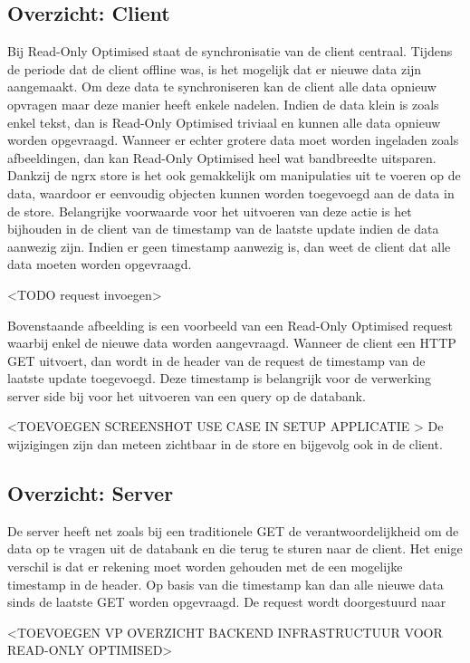 \subsection{Overzicht: Client}
Bij Read-Only Optimised staat de synchronisatie van de client centraal. Tijdens de periode dat de client offline was, is het mogelijk dat er nieuwe data zijn aangemaakt. Om deze data te synchroniseren kan de client alle data opnieuw opvragen maar deze manier heeft enkele nadelen. Indien de data klein is zoals enkel tekst, dan is Read-Only Optimised triviaal en kunnen alle data opnieuw worden opgevraagd. Wanneer er echter grotere data moet worden ingeladen zoals afbeeldingen, dan kan Read-Only Optimised heel wat bandbreedte uitsparen. Dankzij de ngrx store is het ook gemakkelijk om manipulaties uit te voeren op de data, waardoor er eenvoudig objecten kunnen worden toegevoegd aan de data in de store. Belangrijke voorwaarde voor het uitvoeren van deze actie is het bijhouden in de client van de timestamp van de laatste update indien de data aanwezig zijn. Indien er geen timestamp aanwezig is, dan weet de client dat alle data moeten worden opgevraagd.

<TODO request invoegen>

Bovenstaande afbeelding is een voorbeeld van een Read-Only Optimised request waarbij enkel de nieuwe data worden aangevraagd. Wanneer de client een HTTP GET uitvoert, dan wordt in de header van de request de timestamp van de laatste update toegevoegd. Deze timestamp is belangrijk voor de verwerking server side bij voor het uitvoeren van een query op de databank.

<TOEVOEGEN SCREENSHOT USE CASE IN SETUP APPLICATIE >
De wijzigingen zijn dan meteen zichtbaar in de store en bijgevolg ook in de client.
\subsection{Overzicht: Server}
De server heeft net zoals bij een traditionele GET de verantwoordelijkheid om de data op te vragen uit de databank en die terug te sturen naar de client. Het enige verschil is dat er rekening moet worden gehouden met de een mogelijke timestamp in de header. Op basis van die timestamp kan dan alle nieuwe data sinds de laatste GET worden opgevraagd. De request wordt doorgestuurd naar 

<TOEVOEGEN VP OVERZICHT BACKEND INFRASTRUCTUUR VOOR READ-ONLY OPTIMISED>

